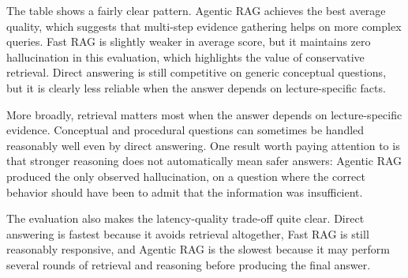 The table shows a fairly clear pattern. Agentic RAG achieves the best average quality, which suggests that multi-step evidence gathering helps on more complex queries. Fast RAG is slightly weaker in average score, but it maintains zero hallucination in this evaluation, which highlights the value of conservative retrieval. Direct answering is still competitive on generic conceptual questions, but it is clearly less reliable when the answer depends on lecture-specific facts.

More broadly, retrieval matters most when the answer depends on lecture-specific evidence. Conceptual and procedural questions can sometimes be handled reasonably well even by direct answering. One result worth paying attention to is that stronger reasoning does not automatically mean safer answers: Agentic RAG produced the only observed hallucination, on a question where the correct behavior should have been to admit that the information was insufficient.

The evaluation also makes the latency-quality trade-off quite clear. Direct answering is fastest because it avoids retrieval altogether, Fast RAG is still reasonably responsive, and Agentic RAG is the slowest because it may perform several rounds of retrieval and reasoning before producing the final answer.
